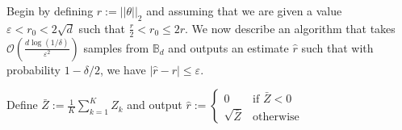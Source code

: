 Begin by defining $r:=||\theta||_2$ and assuming that we are given a value $\varepsilon< r_0< 2\sqrt{d}$ such that $\frac{r}{2}< r_0\leq 2r$. We now describe an algorithm that takes $\mathcal{O}\left(\frac{d\log(1/\delta)}{\varepsilon^2}\right)$ samples from $\mathbb{B}_d$ and  outputs an estimate $\hat r$ such that with probability $1-\delta/2$, we have $|\hat r-r|\leq \varepsilon$.


\begin{algorithm2e}[H]\label{alg:ball-additive}
\caption{$\varepsilon$-additive error $\ell_2$-norm estimation algorithm}
\LinesNumbered
{}


Define $\bar{Z} := \frac{1}{K} \sum_{k=1}^{K} Z_k$ and
output $\hat{r} :=
\begin{cases}
0 & \text{if } \bar{Z} <0 \\
\sqrt{\bar{Z}} & \text{otherwise}
\end{cases}$
\end{algorithm2e}







